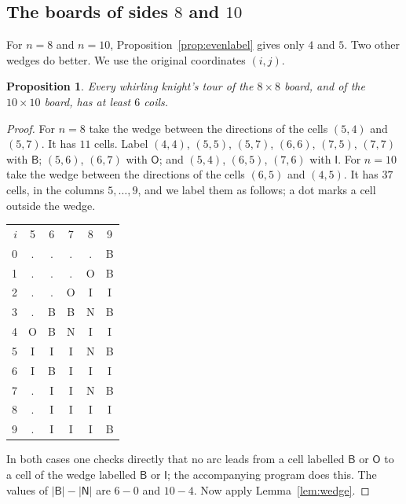 \documentclass[11pt]{amsart}
\newtheorem{proposition}[theorem]{Proposition}
\theoremstyle{remark}
\begin{document}
\subsection*{The boards of sides $8$ and $10$}
For $n=8$ and $n=10$, Proposition~\ref{prop:evenlabel} gives only $4$ and $5$. Two other wedges do better. We use
the original coordinates $(i,j)$.

\begin{proposition}\label{prop:small}
Every whirling knight's tour of the $8\times8$ board, and of the $10\times10$ board, has at least $6$ coils.
\end{proposition}
\begin{proof}
For $n=8$ take the wedge between the directions of the cells $(5,4)$ and $(5,7)$. It has $11$ cells. Label
$(4,4)$, $(5,5)$, $(5,7)$, $(6,6)$, $(7,5)$, $(7,7)$ with $\mathsf B$; $(5,6)$, $(6,7)$ with $\mathsf O$; and $(5,4)$,
$(6,5)$, $(7,6)$ with $\mathsf I$. For $n=10$ take the wedge between the directions of the cells $(6,5)$ and $(4,5)$.
It has $37$ cells, in the columns $5,\dots,9$, and we label them as follows; a dot marks a cell outside the wedge.
\begin{center}\small\ttfamily
\begin{tabular}{r@{\quad}ccccc}
$i$ & 5 & 6 & 7 & 8 & 9\\
0 & . & . & . & . & B\\
1 & . & . & . & O & B\\
2 & . & . & O & I & I\\
3 & . & B & B & N & B\\
4 & O & B & N & I & I\\
5 & I & I & I & N & B\\
6 & I & B & I & I & I\\
7 & . & I & I & N & B\\
8 & . & I & I & I & I\\
9 & . & I & I & I & B
\end{tabular}
\end{center}
In both cases one checks directly that no arc leads from a cell labelled $\mathsf B$ or $\mathsf O$ to a cell of the
wedge labelled $\mathsf B$ or $\mathsf I$; the accompanying program does this. The values of
$|\mathsf B|-|\mathsf N|$ are $6-0$ and $10-4$. Now apply Lemma~\ref{lem:wedge}.
\end{proof}
\end{document}
